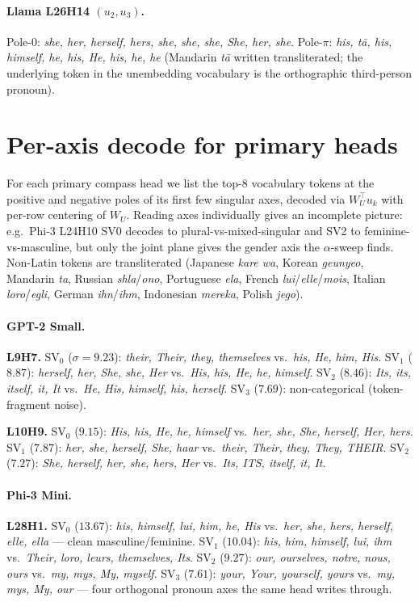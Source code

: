 \paragraph{Llama L26H14 $(u_2, u_3)$.}
Pole-$0$: \emph{she, her, herself, hers, she, she, she, She, her, she}.
Pole-$\pi$: \emph{his, t\=a, his, himself, he, his, He, his, he, he}
(Mandarin \emph{t\=a} written transliterated; the underlying token in
the unembedding vocabulary is the orthographic third-person pronoun).

\section{Per-axis decode for primary heads}
\label{app:full_decode}

For each primary compass head we list the top-$8$ vocabulary
tokens at the positive and negative poles of its first few
singular axes, decoded via $W_U^\top u_k$ with per-row centering
of $W_U$. Reading axes individually gives an incomplete picture:
e.g.\ Phi-3 L24H10 SV0 decodes to plural-vs-mixed-singular and
SV2 to feminine-vs-masculine, but only the joint plane gives the
gender axis the $\alpha$-sweep finds. Non-Latin tokens are
transliterated (Japanese \emph{kare wa}, Korean \emph{geunyeo},
Mandarin \emph{ta}, Russian \emph{shla}/\emph{ono}, Portuguese
\emph{ela}, French \emph{lui}/\emph{elle}/\emph{mois}, Italian
\emph{loro}/\emph{egli}, German \emph{ihn}/\emph{ihm},
Indonesian \emph{mereka}, Polish \emph{jego}).

\paragraph{GPT-2 Small.}
\textbf{L9H7.} SV$_0$ ($\sigma{=}9.23$): \emph{their, Their, they,
themselves} vs.\ \emph{his, He, him, His}. SV$_1$ ($8.87$):
\emph{herself, her, She, she, Her} vs.\ \emph{His, his, He, he,
himself}. SV$_2$ ($8.46$): \emph{Its, its, itself, it, It} vs.\
\emph{He, His, himself, his, herself}. SV$_3$ ($7.69$):
non-categorical (token-fragment noise).

\textbf{L10H9.} SV$_0$ ($9.15$): \emph{His, his, He, he, himself}
vs.\ \emph{her, she, She, herself, Her, hers}. SV$_1$ ($7.87$):
\emph{her, she, herself, She, haar} vs.\ \emph{their, Their, they,
They, THEIR}. SV$_2$ ($7.27$): \emph{She, herself, her, she, hers,
Her} vs.\ \emph{Its, ITS, itself, it, It}.

\paragraph{Phi-3 Mini.}
\textbf{L28H1.} SV$_0$ ($13.67$): \emph{his, himself, lui, him,
he, His} vs.\ \emph{her, she, hers, herself, elle, ella} ---
clean masculine/feminine. SV$_1$ ($10.04$): \emph{his, him,
himself, lui, ihm} vs.\ \emph{Their, loro, leurs, themselves,
Its}. SV$_2$ ($9.27$): \emph{our, ourselves, notre, nous, ours}
vs.\ \emph{my, mys, My, myself}. SV$_3$ ($7.61$): \emph{your,
Your, yourself, yours} vs.\ \emph{my, mys, My, our} --- four
orthogonal pronoun axes the same head writes through.


